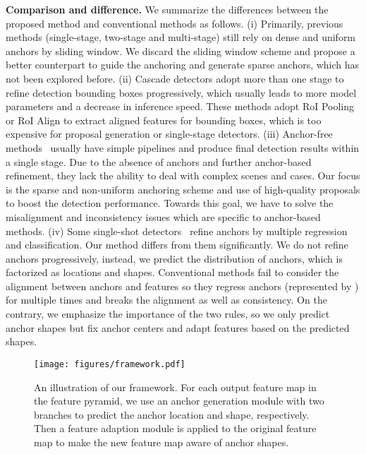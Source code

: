 \documentclass[10pt,twocolumn,letterpaper]{article}
\begin{document}
\noindent
\textbf{Comparison and difference.}
We summarize the differences between the proposed method and conventional methods as follows.
(i) Primarily, previous methods (single-stage, two-stage and multi-stage) still
rely on dense and uniform anchors by sliding window. We discard the sliding
window scheme and propose a better counterpart to guide the anchoring and
generate sparse anchors, which has not been explored before.
(ii) Cascade detectors adopt more than one stage to refine detection bounding
boxes progressively, which usually leads to more model parameters and a decrease in inference speed.
These methods adopt RoI Pooling or RoI Align to extract aligned features for bounding boxes,
which is too expensive for proposal generation or single-stage detectors.
(iii) Anchor-free methods~\cite{huang2015densebox,jie2016scale,redmon2016you}
usually have simple pipelines and produce final detection results within a single stage.
Due to the absence of anchors and further anchor-based refinement,
they lack the ability to deal with complex scenes and cases.
Our focus is the sparse and non-uniform anchoring scheme and use of high-quality
proposals to boost the detection performance.
Towards this goal, we have to solve the misalignment and inconsistency issues which are specific to anchor-based methods.
(iv) Some single-shot detectors~\cite{zhang2017single,wu2018singleshot} refine
anchors by multiple regression and classification.
Our method differs from them significantly.
We do not refine anchors progressively, instead, we predict the distribution of
anchors, which is factorized as locations and shapes.
Conventional methods fail to consider the alignment between anchors and features
so they regress anchors (represented by ) for multiple times and breaks the alignment as well as consistency.
On the contrary, we emphasize the importance of the two rules,
so we only predict anchor shapes but fix anchor centers and adapt features based on the predicted shapes.
 

\begin{figure*}[t]
	\centering
	\texttt{[image: figures/framework.pdf]}
	\caption{\small{An illustration of our framework. For each output feature map in the
		feature pyramid, we use an anchor generation module with two branches to
		predict the anchor location and shape, respectively. Then a feature
		adaption module is applied to the original feature map to make the
		new feature map aware of anchor shapes.}}
	\label{fig:framework}
	\vspace{-15pt}
\end{figure*}
\end{document}
